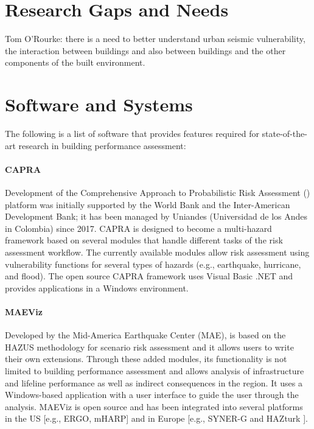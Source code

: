 \section{Research Gaps and Needs}
\label{sec:perf_bldg_gaps}

Tom O'Rourke: there is a need to better understand urban seismic vulnerability, the interaction between buildings and also between buildings and the other components of the built environment.

\section{Software and Systems}
\label{sec:perf_bldg_tools}

The following is a list of software that provides features required for state-of-the-art research in building performance assessment:

\paragraph{CAPRA} Development of the Comprehensive Approach to Probabilistic Risk Assessment () platform was initially supported by the World Bank and the Inter-American Development Bank; it has been managed by Uniandes (Universidad de los Andes in Colombia) since 2017. CAPRA is designed to become a multi-hazard framework based on several modules that handle different tasks of the risk assessment workflow. The currently available modules allow risk assessment using vulnerability functions for several types of hazards (e.g., earthquake, hurricane, and flood). The open source CAPRA framework uses Visual Basic .NET and provides applications in a Windows environment.

\paragraph{MAEViz} 
Developed by the Mid-America Earthquake Center (MAE),  is based on the HAZUS methodology for scenario risk assessment and it allows users to write their own extensions. Through these added modules, its functionality is not limited to building performance assessment and allows analysis of infrastructure and lifeline performance as well as indirect consequences in the region. It uses a Windows-based application with a user interface to guide the user through the analysis. MAEViz is open source and has been integrated into several platforms in the US [e.g., ERGO, mHARP] and in Europe [e.g., SYNER-G \citep{pitilakis2014synerg} and HAZturk \citep{karaman2008earthquake}].

